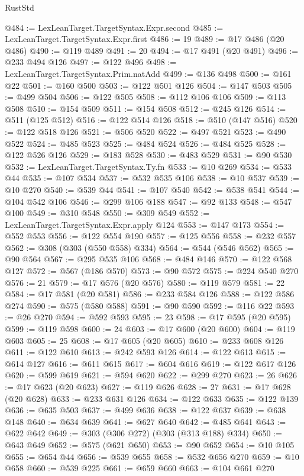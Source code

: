 \begin{lexlean}{RustStd}
\begin{coremodule}
{\begin{coremodule}
{{{{{{{{{{{{{{{{{{{{{{{{{{{{{{{{{{{{{{{{{{{{{{{{{{{{{{{{{{{{{{{{{{{{@484 := LexLeanTarget.TargetSyntax.Expr.second
@485 := LexLeanTarget.TargetSyntax.Expr.first
@486 := 19
@489 := @17 @486 (@20 @486)
@490 := @119 @489
@491 := 20
@494 := @17 @491 (@20 @491)
@496 := @233 @494 @126
@497 := @122 @496
@498 := LexLeanTarget.TargetSyntax.Prim.natAdd
@499 := @136 @498
@500 := @161 @22
@501 := @160 @500
@503 := @122 @501 @126
@504 := @147 @503
@505 := @499 @504
@506 := @122 @505
@508 := @112 @106 @106
@509 := @113 @508
@510 := @154 @509
@511 := @154 @508
@512 := @245 @126
@514 := @511 (@125 @512)
@516 := @122 @514 @126
@518 := @510 (@147 @516)
@520 := @122 @518 @126
@521 := @506 @520
@522 := @497 @521
@523 := @490 @522
@524 := @485 @523
@525 := @484 @524
@526 := @484 @525
@528 := @122 @526 @126
@529 := @183 @528
@530 := @483 @529
@531 := @90 @530
@532 := LexLeanTarget.TargetSyntax.Ty.fn
@533 := @10 @269
@534 := @533 @44
@535 := @107 @534
@537 := @532 @535 @106
@538 := @10 @537
@539 := @10 @270
@540 := @539 @44
@541 := @107 @540
@542 := @538 @541
@544 := @104 @542 @106
@546 := @299 @106 @188
@547 := @92 @133
@548 := @547 @100
@549 := @310 @548
@550 := @309 @549
@552 := LexLeanTarget.TargetSyntax.Expr.apply @124
@553 := @147 @173
@554 := @552 @553
@556 := @122 @554 @190
@557 := @125 @556
@558 := @232 @557
@562 := @308 (@303 (@550 @558) @334)
@564 := @544 (@546 @562)
@565 := @90 @564
@567 := @295 @535 @106
@568 := @484 @146
@570 := @122 @568 @127
@572 := @567 (@186 @570)
@573 := @90 @572
@575 := @224 @540 @270
@576 := 21
@579 := @17 @576 (@20 @576)
@580 := @119 @579
@581 := 22
@584 := @17 @581 (@20 @581)
@586 := @233 @584 @126
@588 := @122 @586 @274
@590 := @575 (@580 @588)
@591 := @90 @590
@592 := @116 @22
@593 := @26 @270
@594 := @592 @593
@595 := 23
@598 := @17 @595 (@20 @595)
@599 := @119 @598
@600 := 24
@603 := @17 @600 (@20 @600)
@604 := @119 @603
@605 := 25
@608 := @17 @605 (@20 @605)
@610 := @233 @608 @126
@611 := @122 @610
@613 := @242 @593 @126
@614 := @122 @613
@615 := @614 @127
@616 := @611 @615
@617 := @604 @616
@619 := @122 @617 @126
@620 := @599 @619
@621 := @594 @620
@622 := @299 @270
@623 := 26
@626 := @17 @623 (@20 @623)
@627 := @119 @626
@628 := 27
@631 := @17 @628 (@20 @628)
@633 := @233 @631 @126
@634 := @122 @633
@635 := @122 @139
@636 := @635 @503
@637 := @499 @636
@638 := @122 @637
@639 := @638 @148
@640 := @634 @639
@641 := @627 @640
@642 := @485 @641
@643 := @622 @642
@649 := @303 (@306 @272) (@303 (@313 @188) @334)
@650 := @643 @649
@652 := @575 (@621 @650)
@653 := @90 @652
@654 := @10 @105
@655 := @654 @44
@656 := @539 @655
@658 := @532 @656 @270
@659 := @10 @658
@660 := @539 @225
@661 := @659 @660
@663 := @104 @661 @270
}}}}}}}}}}}}}}}}}}}}}}}}}}}}}}}}}}}}}}}}}}}}}}}}}}}}}}}}}}}}}}}}}}}}
\end{coremodule}}
\end{coremodule}
\end{lexlean}
